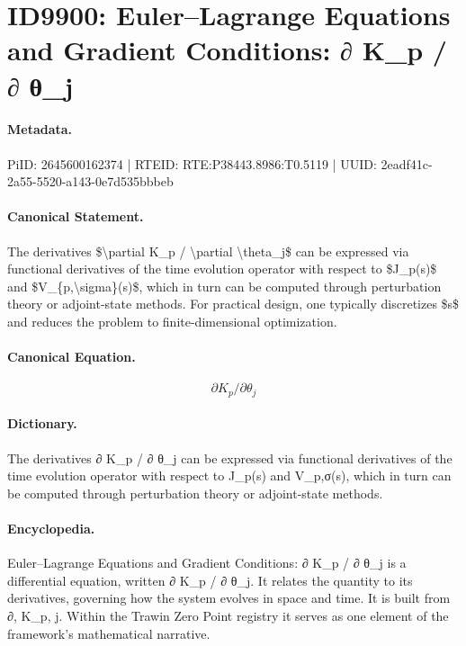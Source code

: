 \section*{ID9900: Euler–Lagrange Equations and Gradient Conditions: ∂ K\_p / ∂ θ\_j}
\paragraph{Metadata.}
PiID: 2645600162374 | RTEID: RTE:P38443.8986:T0.5119 | UUID: 2eadf41c-2a55-5520-a143-0e7d535bbbeb

\paragraph{Canonical Statement.}
The derivatives \$\textbackslash{}partial K\_p / \textbackslash{}partial \textbackslash{}theta\_j\$ can be expressed via functional derivatives of the time evolution operator with respect to \$J\_p(s)\$ and \$V\_\{p,\textbackslash{}sigma\}(s)\$, which in turn can be computed through perturbation theory or adjoint-state methods. For practical design, one typically discretizes \$s\$ and reduces the problem to finite-dimensional optimization.

\paragraph{Canonical Equation.}
\[
\partial K_p / \partial \theta_j
\]

\paragraph{Dictionary.}
The derivatives ∂ K\_p / ∂ θ\_j can be expressed via functional derivatives of the time evolution operator with respect to J\_p(s) and V\_p,σ(s), which in turn can be computed through perturbation theory or adjoint-state methods.

\paragraph{Encyclopedia.}
Euler–Lagrange Equations and Gradient Conditions: ∂ K\_p / ∂ θ\_j is a differential equation, written ∂ K\_p / ∂ θ\_j. It relates the quantity to its derivatives, governing how the system evolves in space and time. It is built from ∂, K\_p, j. Within the Trawin Zero Point registry it serves as one element of the framework's mathematical narrative.
